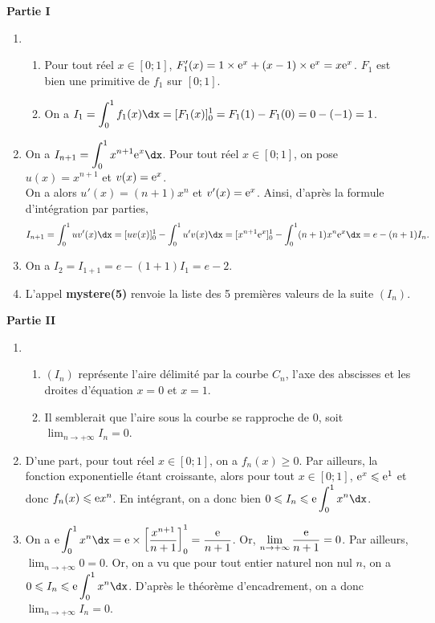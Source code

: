 \documentclass[11pt,fleqn, openany]{book} %
\begin{document}
\begin{solution}
\textbf{Partie I}

\begin{enumerate}
\item \begin{enumerate}
\item Pour tout réel $x\in [0;1]$, $F_1'(x)=1 \times \mathrm{e}^x+(x-1)\times\mathrm{e}^x=x\mathrm{e}^x$. $F_1$ est bien une primitive de $f_1$ sur $[0;1]$.
\item On a $I_1=\displaystyle\int_0^1f_1(x)\dx=[F_1(x)]_0^1=F_1(1)-F_1(0)=0-(-1)=1$.
\end{enumerate}
\item On a $I_{n+1}=\displaystyle\int_0^1x^{n+1}\e^x\dx$.
Pour tout réel $x\in [0;1]$, on pose $u(x)=x^{n+1}$ et $v(x)=\mathrm{e}^x$.\\ On a alors $u'(x)=(n+1)x^n$ et $v'(x)=\mathrm{e}^x$. Ainsi, d'après la formule d'intégration par parties,
\[I_{n+1}=\displaystyle\int_0^1 uv'(x)\dx = [uv(x)]_0^1-\displaystyle\int_0^1u'v(x)\dx=[x^{n+1}\e^x]_0^1-\displaystyle\int_0^1 (n+1)x^n\e^x\dx=e-(n+1)I_{n}.\]
\item On a $I_2=I_{1+1}=e-(1+1)I_1=e-2$.
\item L'appel \textbf{mystere(5)} renvoie la liste des 5 premières valeurs de la suite $(I_n)$.
\end{enumerate}

\textbf{Partie II}

\begin{enumerate}
\item \begin{enumerate}
\item $(I_n)$ représente l'aire délimité par la courbe $C_n$, l'axe des abscisses et les droites d'équation $x=0$ et $x=1$.
\item Il semblerait que l'aire sous la courbe se rapproche de 0, soit $\displaystyle\lim_{n \to +\infty}I_n=0$.
\end{enumerate}
\item D'une part, pour tout réel $x\in[0;1]$, on a $f_n(x)\geqslant 0$. Par ailleurs, la fonction exponentielle étant croissante, alors pour tout $x\in[0;1]$, $\mathrm{e}^x \leqslant \mathrm{e}^1$ et donc $f_n(x)\leqslant \mathrm{e} x^n$. En intégrant, on a donc bien $0 \leqslant I_n \leqslant \e \displaystyle\int_0^1x^n \dx$.
\item On a $\e \displaystyle\int_0^1x^n \dx=\e \times \left[\dfrac{x^{n+1}}{n+1}\right]_0^1=\dfrac{\e}{n+1}$. Or, $\displaystyle\lim_{n \to +\infty}\dfrac{\mathrm{e}}{n+1}=0$. Par ailleurs, $\displaystyle\lim_{n \to + \infty}0=0$. Or, on a vu que pour tout entier naturel non nul $n$, on a $0 \leqslant I_n \leqslant \e \displaystyle\int_0^1x^n \dx$. D'après le théorème d'encadrement, on a donc $\displaystyle\lim_{n \to +\infty}I_n=0$.
\end{enumerate}

\end{solution}
\end{document}
